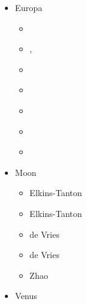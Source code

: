 \begin{itemize}

\item Europa 
\begin{scriptsize}
\begin{itemize}
\item[\twothousandfour] \cite{shha04}
\item[\twothousandfive] \cite{shha05}, \cite{mish05}
\item[\twothousandeight] \cite{hash08}
\item[\twothousandten] \cite{hash10}
\item[\twothousandeleven] \cite{hash11}
\item[\twothousandfourteen] \cite{kast14}
\item[\twothousandnineteen] \cite{almc19}
\end{itemize}
\end{scriptsize}

\item Moon 
\begin{scriptsize}
\begin{itemize}
\item[\twothousandtwo] Elkins-Tanton \etal \cite{elvh02}
\item[\twothousandfour] Elkins-Tanton \etal \cite{elhg04}
\item[\twothousandten] de Vries \etal \cite{devv10}
\item[\twothousandthirteen] de Vries \etal \cite{dejv13} 
\item[\twothousandnineteen] Zhao \etal \cite{zhdv19}
\end{itemize}
\end{scriptsize}
 
\item Venus 


\end{itemize}
